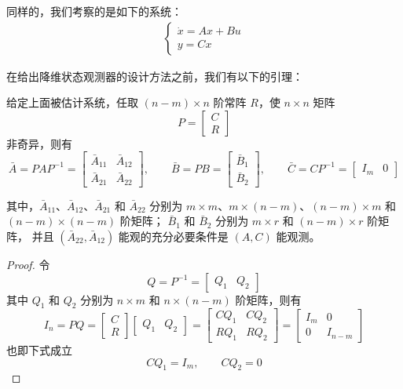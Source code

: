 同样的，我们考察的是如下的系统：
\begin{align*}
    \begin{cases}
        \dot{x} = Ax+Bu \\
        y = Cx
    \end{cases}
\end{align*}

在给出降维状态观测器的设计方法之前，我们有以下的引理：
\begin{lemma}
    给定上面被估计系统，任取 $(n-m)\times n$ 阶常阵 $R$，使 $n\times n$ 矩阵
    \[
    P=
    \begin{bmatrix}
    C\\
    R
    \end{bmatrix}
    \]
    非奇异，则有
    \[
    \bar{A}=PAP^{-1}
    =
    \begin{bmatrix}
    \bar{A}_{11} & \bar{A}_{12}\\
    \bar{A}_{21} & \bar{A}_{22}
    \end{bmatrix},
    \qquad
    \bar{B}=PB
    =
    \begin{bmatrix}
    \bar{B}_1\\
    \bar{B}_2
    \end{bmatrix},
    \qquad
    \bar{C}=CP^{-1}
    =
    \begin{bmatrix}
    I_m & 0
    \end{bmatrix}
    \]

    其中，$\bar{A}_{11}$、$\bar{A}_{12}$、$\bar{A}_{21}$ 和 $\bar{A}_{22}$ 分别为
    $m\times m$、$m\times(n-m)$、$(n-m)\times m$ 和 $(n-m)\times(n-m)$ 阶矩阵；
    $\bar{B}_1$ 和 $\bar{B}_2$ 分别为 $m\times r$ 和 $(n-m)\times r$ 阶矩阵，
    并且 $(\bar{A}_{22},\bar{A}_{12})$ 能观的充分必要条件是 $(A,C)$ 能观测。
    \begin{proof}
    令
    \[
    Q=P^{-1}
    =
    \begin{bmatrix}
    Q_1 & Q_2
    \end{bmatrix}
    \]
    其中 $Q_1$ 和 $Q_2$ 分别为 $n\times m$ 和 $n\times(n-m)$ 阶矩阵，则有
    \[
    I_n
    =
    PQ
    =
    \begin{bmatrix}
    C\\
    R
    \end{bmatrix}
    \begin{bmatrix}
    Q_1 & Q_2
    \end{bmatrix}
    =
    \begin{bmatrix}
    CQ_1 & CQ_2\\
    RQ_1 & RQ_2
    \end{bmatrix}
    =
    \begin{bmatrix}
    I_m & 0\\
    0 & I_{n-m}
    \end{bmatrix}
    \]
    也即下式成立
    \[
    CQ_1=I_m,\qquad CQ_2=0
    \]


\end{proof}
\end{lemma}
